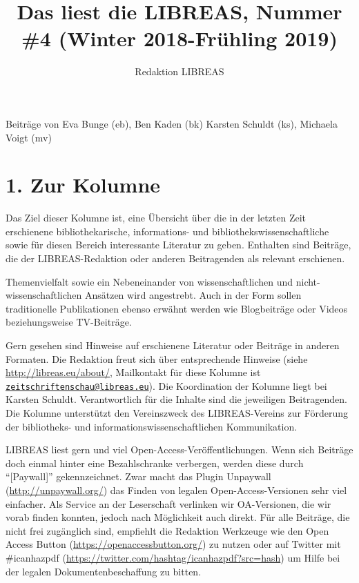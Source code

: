 \documentclass[a4paper,
fontsize=11pt,
oneside,
numbers=noperiodatend,
parskip=half-,
bibliography=totoc,
final
]{scrartcl}
\title{\LARGE{Das liest die LIBREAS, Nummer \#4 (Winter 2018-Frühling 2019)}} %
\author{Redaktion LIBREAS} %
\date{}
\begin{document}
\maketitle
\thispagestyle{fancyplain} 


Beiträge von Eva Bunge (eb), Ben Kaden (bk) Karsten Schuldt (ks),
Michaela Voigt (mv)

\hypertarget{zur-kolumne}{%
\section*{1. Zur Kolumne}\label{zur-kolumne}}

Das Ziel dieser Kolumne ist, eine Übersicht über die in der letzten Zeit
erschienene bibliothekarische, informations- und
bibliothekswissenschaftliche sowie für diesen Bereich interessante
Literatur zu geben. Enthalten sind Beiträge, die der LIBREAS-Redaktion
oder anderen Beitragenden als relevant erschienen.

Themenvielfalt sowie ein Nebeneinander von wissenschaftlichen und
nicht-wissenschaftlichen Ansätzen wird angestrebt. Auch in der Form
sollen traditionelle Publikationen ebenso erwähnt werden wie
Blogbeiträge oder Videos beziehungsweise TV-Beiträge.

Gern gesehen sind Hinweise auf erschienene Literatur oder Beiträge in
anderen Formaten. Die Redaktion freut sich über entsprechende Hinweise
(siehe \url{http://libreas.eu/about/}, Mailkontakt für diese Kolumne ist
\href{mailto:zeitschriftenschau@libreas.eu}{\nolinkurl{zeitschriftenschau@libreas.eu}}).
Die Koordination der Kolumne liegt bei Karsten Schuldt. Verantwortlich
für die Inhalte sind die jeweiligen Beitragenden. Die Kolumne
unterstützt den Vereinszweck des LIBREAS-Vereins zur Förderung der
bibliotheks- und informationswissenschaftlichen Kommunikation.

LIBREAS liest gern und viel Open-Access-Veröffentlichungen. Wenn sich
Beiträge doch einmal hinter eine Bezahlschranke verbergen, werden diese
durch \enquote{{[}Paywall{]}} gekennzeichnet. Zwar macht das Plugin
Unpaywall (\url{http://unpaywall.org/}) das Finden von legalen
Open-Access-Versionen sehr viel einfacher. Als Service an der
Leserschaft verlinken wir OA-Versionen, die wir vorab finden konnten,
jedoch nach Möglichkeit auch direkt. Für alle Beiträge, die nicht frei
zugänglich sind, empfiehlt die Redaktion Werkzeuge wie den Open Access
Button (\url{https://openaccessbutton.org/}) zu nutzen oder auf Twitter
mit \#icanhazpdf (\url{https://twitter.com/hashtag/icanhazpdf?src=hash})
um Hilfe bei der legalen Dokumentenbeschaffung zu bitten.
\end{document}
